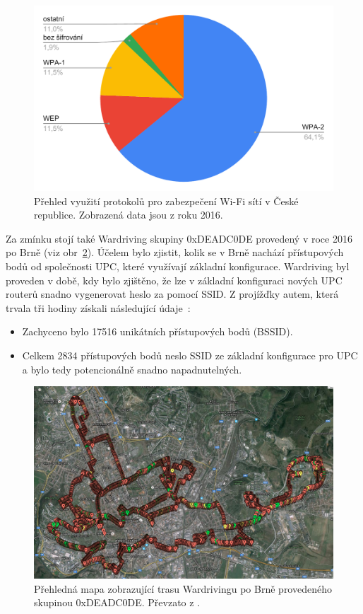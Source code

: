 \begin{figure}[htbp]
  \centering
  \includegraphics[width=15cm]{obrazky-figures/wifileaks.pdf}
  \caption{Přehled využití protokolů pro zabezpečení Wi-Fi sítí v České republice. Zobrazená data jsou z roku 2016.}
  \label{img:rozlozeni}
\end{figure}

Za zmínku stojí také Wardriving skupiny 0xDEADC0DE provedený v roce 2016 po Brně (viz obr~\ref{img:wardriving}). Účelem bylo zjistit, kolik se v Brně nachází přístupových bodů od společnosti UPC, které využívají základní konfigurace. Wardriving byl proveden v době, kdy bylo zjištěno, že lze v základní konfiguraci nových UPC routerů snadno vygenerovat heslo za pomocí SSID. Z projížďky autem, která trvala tři hodiny získali následující údaje~\cite{UPCPassword}:
\begin{itemize}
  \item{Zachyceno bylo 17516 unikátních přístupových bodů (BSSID).}
  \item{Celkem 2834 přístupových bodů neslo SSID ze základní konfigurace pro UPC a bylo tedy potencionálně snadno napadnutelných.}
\end{itemize}

\begin{figure}[htbp]
  \centering
  \includegraphics[width=15cm]{obrazky-figures/wardriving_map.png}
  \caption{Přehledná mapa zobrazující trasu Wardrivingu po Brně provedeného skupinou 0xDEADC0DE. Převzato z \cite{UPCPassword}.}
  \label{img:wardriving}
\end{figure}

